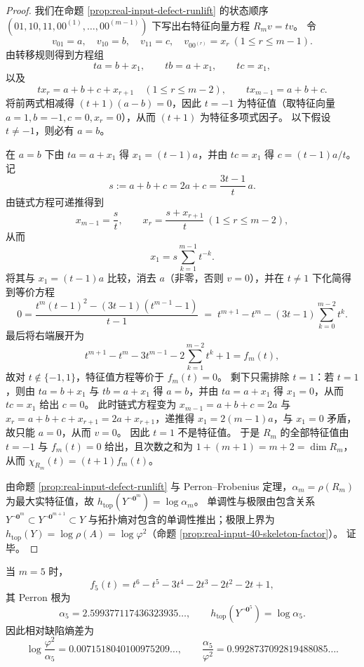 \begin{proof}
我们在命题 \ref{prop:real-input-defect-runlift} 的状态顺序
\(
(01,10,11,00^{(1)},\dots,00^{(m-1)})
\)
下写出右特征向量方程 $R_m v=t v$。
令
\[
v_{01}=a,\quad v_{10}=b,\quad v_{11}=c,\quad v_{00^{(r)}}=x_r\ (1\le r\le m-1).
\]
由转移规则得到方程组
\[
ta=b+x_1,\qquad
tb=a+x_1,\qquad
tc=x_1,
\]
以及
\[
tx_r=a+b+c+x_{r+1}\quad(1\le r\le m-2),
\qquad
tx_{m-1}=a+b+c.
\]
将前两式相减得
\(
(t+1)(a-b)=0
\)，因此 $t=-1$ 为特征值（取特征向量 $a=1,b=-1,c=0,x_r=0$），从而 $(t+1)$ 为特征多项式因子。
以下假设 $t\neq -1$，则必有 $a=b$。

在 $a=b$ 下由 $ta=a+x_1$ 得 $x_1=(t-1)a$，并由 $tc=x_1$ 得 $c=(t-1)a/t$。
记
\[
s:=a+b+c=2a+c=\frac{3t-1}{t}\,a.
\]
由链式方程可递推得到
\[
x_{m-1}=\frac{s}{t},\qquad
x_r=\frac{s+x_{r+1}}{t}\ (1\le r\le m-2),
\]
从而
\[
x_1=s\sum_{k=1}^{m-1}t^{-k}.
\]
将其与 $x_1=(t-1)a$ 比较，消去 $a$（非零，否则 $v=0$），并在 $t\neq 1$ 下化简得到等价方程
\[
0=
\frac{t^m(t-1)^2-(3t-1)(t^{m-1}-1)}{t-1}
\;=\;
t^{m+1}-t^{m}-(3t-1)\sum_{k=0}^{m-2}t^k.
\]
最后将右端展开为
\[
t^{m+1}-t^{m}-3t^{m-1}-2\sum_{k=1}^{m-2}t^k+1
=f_m(t),
\]
故对 $t\notin\{-1,1\}$，特征值方程等价于 $f_m(t)=0$。
剩下只需排除 $t=1$：若 $t=1$，则由 $ta=b+x_1$ 与 $tb=a+x_1$ 得 $a=b$，并由 $ta=a+x_1$ 得 $x_1=0$，从而 $tc=x_1$ 给出 $c=0$。
此时链式方程变为 $x_{m-1}=a+b+c=2a$ 与 $x_r=a+b+c+x_{r+1}=2a+x_{r+1}$，递推得 $x_1=2(m-1)a$，与 $x_1=0$ 矛盾，故只能 $a=0$，从而 $v=0$。
因此 $t=1$ 不是特征值。
于是 $R_m$ 的全部特征值由 $t=-1$ 与 $f_m(t)=0$ 给出，且次数之和为 $1+(m+1)=m+2=\dim R_m$，从而
\(
\chi_{R_m}(t)=(t+1)f_m(t)
\)。

由命题 \ref{prop:real-input-defect-runlift} 与 Perron--Frobenius 定理，$\alpha_m=\rho(R_m)$ 为最大实特征值，故
\(
h_{\mathrm{top}}(Y^{\neg \mathbf{0}^m})=\log\alpha_m
\)。
单调性与极限由包含关系
\(
Y^{\neg \mathbf{0}^m}\subset Y^{\neg \mathbf{0}^{m+1}}\subset Y
\)
与拓扑熵对包含的单调性推出；极限上界为 $h_{\mathrm{top}}(Y)=\log\rho(A)=\log\varphi^2$（命题 \ref{prop:real-input-40-skeleton-factor}）。
证毕。
\end{proof}

\begin{corollary}[\texorpdfstring{$m=5$}{m=5} 的同步缺陷熵常数 \texorpdfstring{$\alpha_5$}{alpha\_5}]\label{cor:real-input-defect-entropy-m5}
当 $m=5$ 时，
\[
f_5(t)=t^6-t^5-3t^4-2t^3-2t^2-2t+1,
\]
其 Perron 根为
\[
\alpha_5=2.599377117436323935\ldots,
\qquad
h_{\mathrm{top}}\!\left(Y^{\neg \mathbf{0}^5}\right)=\log\alpha_5.
\]
因此相对缺陷熵差为
\[
\log\frac{\varphi^2}{\alpha_5}=0.0071518040100975209\ldots,
\qquad
\frac{\alpha_5}{\varphi^2}=0.9928737092819488085\ldots.
\]
\end{corollary}

